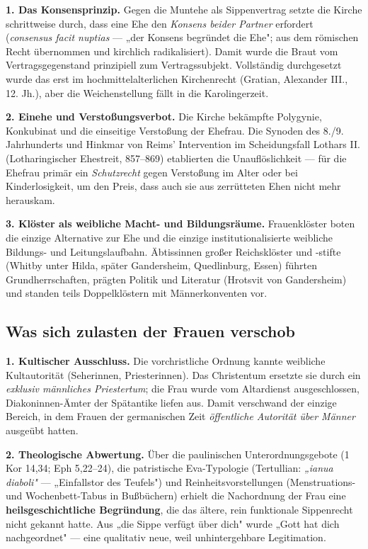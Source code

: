 \documentclass[11pt,a4paper,ngerman]{scrartcl}
\newcommand{\chipbase}[2]{\hspace{0pt}{\footnotesize\textcolor{#1}{[\textsc{#2}]}}}
\newcommand{\chipbelegt}[1]{\chipbase{chipgreen}{#1}}
\newcommand{\chipplausibel}[1]{\chipbase{chipamber}{#1}}
\begin{document}
\textbf{1. Das Konsensprinzip.} Gegen die Muntehe als Sippenvertrag setzte die Kirche schrittweise durch, dass eine Ehe den \emph{Konsens beider Partner} erfordert (\emph{consensus facit nuptias} — „der Konsens begründet die Ehe"; aus dem römischen Recht übernommen und kirchlich radikalisiert). Damit wurde die Braut vom Vertragsgegenstand prinzipiell zum Vertragssubjekt. Vollständig durchgesetzt wurde das erst im hochmittelalterlichen Kirchenrecht (Gratian, Alexander III., 12. Jh.), aber die Weichenstellung fällt in die Karolingerzeit. \chipbelegt{belegt}

\textbf{2. Einehe und Verstoßungsverbot.} Die Kirche bekämpfte Polygynie, Konkubinat und die einseitige Verstoßung der Ehefrau. Die Synoden des 8./9. Jahrhunderts und Hinkmar von Reims' Intervention im Scheidungsfall Lothars II. (Lotharingischer Ehestreit, 857–869) etablierten die Unauflöslichkeit — für die Ehefrau primär ein \emph{Schutzrecht} gegen Verstoßung im Alter oder bei Kinderlosigkeit, um den Preis, dass auch sie aus zerrütteten Ehen nicht mehr herauskam. \chipbelegt{belegt}

\textbf{3. Klöster als weibliche Macht- und Bildungsräume.} Frauenklöster boten die einzige Alternative zur Ehe und die einzige institutionalisierte weibliche Bildungs- und Leitungslaufbahn. Äbtissinnen großer Reichsklöster und -stifte (Whitby unter Hilda, später Gandersheim, Quedlinburg, Essen) führten Grundherrschaften, prägten Politik und Literatur (Hrotsvit von Gandersheim) und standen teils Doppelklöstern mit Männerkonventen vor. \chipbelegt{belegt}

\subsection*{Was sich zulasten der Frauen verschob}

\textbf{1. Kultischer Ausschluss.} Die vorchristliche Ordnung kannte weibliche Kultautorität (Seherinnen, Priesterinnen). Das Christentum ersetzte sie durch ein \emph{exklusiv männliches Priestertum}; die Frau wurde vom Altardienst ausgeschlossen, Diakoninnen-Ämter der Spätantike liefen aus. Damit verschwand der einzige Bereich, in dem Frauen der germanischen Zeit \emph{öffentliche Autorität über Männer} ausgeübt hatten. \chipbelegt{belegt}

\textbf{2. Theologische Abwertung.} Über die paulinischen Unterordnungsgebote (1 Kor 14,34; Eph 5,22–24), die patristische Eva-Typologie (Tertullian: \emph{„ianua diaboli"} — „Einfallstor des Teufels") und Reinheitsvorstellungen (Menstruations- und Wochenbett-Tabus in Bußbüchern) erhielt die Nachordnung der Frau eine \textbf{heilsgeschichtliche Begründung}, die das ältere, rein funktionale Sippenrecht nicht gekannt hatte. Aus „die Sippe verfügt über dich" wurde „Gott hat dich nachgeordnet" — eine qualitativ neue, weil unhintergehbare Legitimation. \chipplausibel{plausibel}
\end{document}

